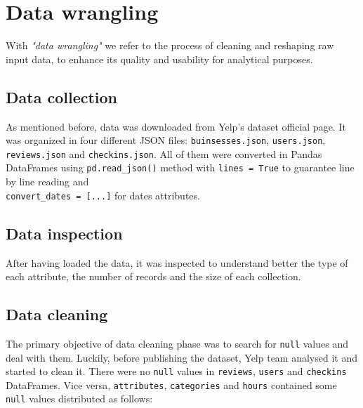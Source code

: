 \documentclass{Configuration_Files/PoliMi3i_thesis}
\begin{document}
\cleardoublepage
\chapter{Data wrangling}
\label{sec:Data wrangling}
With \textit{"data wrangling"} we refer to the process of cleaning and reshaping raw input data, to enhance its quality and usability for analytical purposes. 

\section{Data collection}
As mentioned before, data was downloaded from Yelp's dataset official page. It was organized in four different JSON files: \texttt{buinsesses.json}, \texttt{users.json}, \texttt{reviews.json} and \texttt{checkins.json}. All of them were converted in Pandas DataFrames using \verb|pd.read_json()| method with \verb|lines = True| to guarantee line by line reading and \\\verb|convert_dates = [...]| for dates attributes. 

\section{Data inspection}
After having loaded the data, it was inspected to understand better the type of each attribute, the number of records and the size of each collection. 

\section{Data cleaning}
The primary objective of data cleaning phase was to search for \texttt{null} values and deal with them. Luckily, before publishing the dataset, Yelp team analysed it and started to clean it. There were no \texttt{null} values in \texttt{reviews}, \texttt{users} and \texttt{checkins} DataFrames. Vice versa, \texttt{attributes}, \texttt{categories} and \texttt{hours} contained some \texttt{null} values distributed as follows:

\bigskip
\end{document}
